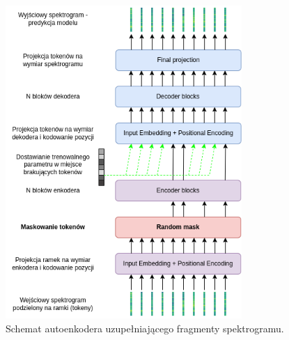\begin{figure}
    \centering
    \includegraphics[width=0.8\textwidth]{./images/mae_transformer.png}
    \caption{Schemat autoenkodera uzupełniającego fragmenty spektrogramu.}
    \label{fig:mae_transformer}
\end{figure}

